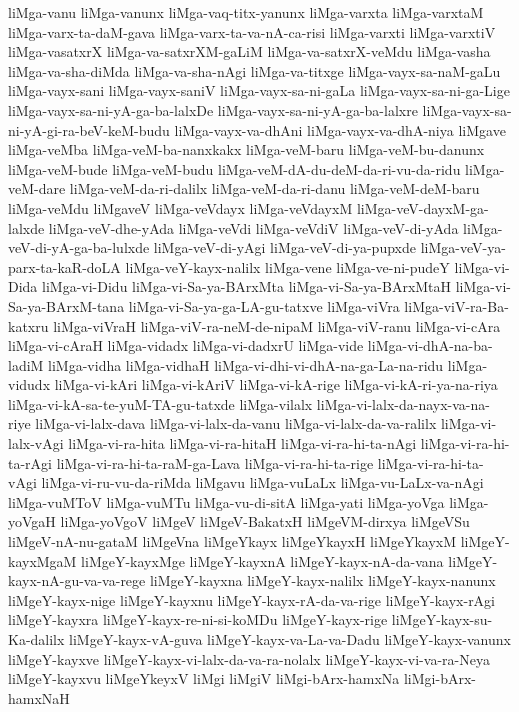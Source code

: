 {liMga-vanu
liMga-vanunx
liMga-vaq-titx-yanunx
liMga-varxta
liMga-varxtaM
liMga-varx-ta-daM-gava
liMga-varx-ta-va-nA-ca-risi
liMga-varxti
liMga-varxtiV
liMga-vasatxrX
liMga-va-satxrXM-gaLiM
liMga-va-satxrX-veMdu
liMga-vasha
liMga-va-sha-diMda
liMga-va-sha-nAgi
liMga-va-titxge
liMga-vayx-sa-naM-gaLu
liMga-vayx-sani
liMga-vayx-saniV
liMga-vayx-sa-ni-gaLa
liMga-vayx-sa-ni-ga-Lige
liMga-vayx-sa-ni-yA-ga-ba-lalxDe
liMga-vayx-sa-ni-yA-ga-ba-lalxre
liMga-vayx-sa-ni-yA-gi-ra-beV-keM-budu
liMga-vayx-va-dhAni
liMga-vayx-va-dhA-niya
liMgave
liMga-veMba
liMga-veM-ba-nanxkakx
liMga-veM-baru
liMga-veM-bu-danunx
liMga-veM-bude
liMga-veM-budu
liMga-veM-dA-du-deM-da-ri-vu-da-ridu
liMga-veM-dare
liMga-veM-da-ri-dalilx
liMga-veM-da-ri-danu
liMga-veM-deM-baru
liMga-veMdu
liMgaveV
liMga-veVdayx
liMga-veVdayxM
liMga-veV-dayxM-ga-lalxde
liMga-veV-dhe-yAda
liMga-veVdi
liMga-veVdiV
liMga-veV-di-yAda
liMga-veV-di-yA-ga-ba-lulxde
liMga-veV-di-yAgi
liMga-veV-di-ya-pupxde
liMga-veV-ya-parx-ta-kaR-doLA
liMga-veY-kayx-nalilx
liMga-vene
liMga-ve-ni-pudeY
liMga-vi-Dida
liMga-vi-Didu
liMga-vi-Sa-ya-BArxMta
liMga-vi-Sa-ya-BArxMtaH
liMga-vi-Sa-ya-BArxM-tana
liMga-vi-Sa-ya-ga-LA-gu-tatxve
liMga-viVra
liMga-viV-ra-Ba-katxru
liMga-viVraH
liMga-viV-ra-neM-de-nipaM
liMga-viV-ranu
liMga-vi-cAra
liMga-vi-cAraH
liMga-vidadx
liMga-vi-dadxrU
liMga-vide
liMga-vi-dhA-na-ba-ladiM
liMga-vidha
liMga-vidhaH
liMga-vi-dhi-vi-dhA-na-ga-La-na-ridu
liMga-vidudx
liMga-vi-kAri
liMga-vi-kAriV
liMga-vi-kA-rige
liMga-vi-kA-ri-ya-na-riya
liMga-vi-kA-sa-te-yuM-TA-gu-tatxde
liMga-vilalx
liMga-vi-lalx-da-nayx-va-na-riye
liMga-vi-lalx-dava
liMga-vi-lalx-da-vanu
liMga-vi-lalx-da-va-ralilx
liMga-vi-lalx-vAgi
liMga-vi-ra-hita
liMga-vi-ra-hitaH
liMga-vi-ra-hi-ta-nAgi
liMga-vi-ra-hi-ta-rAgi
liMga-vi-ra-hi-ta-raM-ga-Lava
liMga-vi-ra-hi-ta-rige
liMga-vi-ra-hi-ta-vAgi
liMga-vi-ru-vu-da-riMda
liMgavu
liMga-vuLaLx
liMga-vu-LaLx-va-nAgi
liMga-vuMToV
liMga-vuMTu
liMga-vu-di-sitA
liMga-yati
liMga-yoVga
liMga-yoVgaH
liMga-yoVgoV
liMgeV
liMgeV-BakatxH
liMgeVM-dirxya
liMgeVSu
liMgeV-nA-nu-gataM
liMgeVna
liMgeYkayx
liMgeYkayxH
liMgeYkayxM
liMgeY-kayxMgaM
liMgeY-kayxMge
liMgeY-kayxnA
liMgeY-kayx-nA-da-vana
liMgeY-kayx-nA-gu-va-va-rege
liMgeY-kayxna
liMgeY-kayx-nalilx
liMgeY-kayx-nanunx
liMgeY-kayx-nige
liMgeY-kayxnu
liMgeY-kayx-rA-da-va-rige
liMgeY-kayx-rAgi
liMgeY-kayxra
liMgeY-kayx-re-ni-si-koMDu
liMgeY-kayx-rige
liMgeY-kayx-su-Ka-dalilx
liMgeY-kayx-vA-guva
liMgeY-kayx-va-La-va-Dadu
liMgeY-kayx-vanunx
liMgeY-kayxve
liMgeY-kayx-vi-lalx-da-va-ra-nolalx
liMgeY-kayx-vi-va-ra-Neya
liMgeY-kayxvu
liMgeYkeyxV
liMgi
liMgiV
liMgi-bArx-hamxNa
liMgi-bArx-hamxNaH
}
